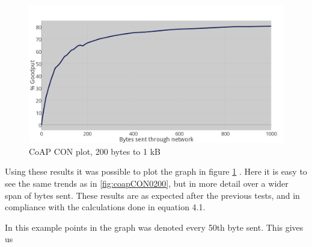 \begin{figure}[ht]
    \centering
    \includegraphics[width=\textwidth]{CON0toK_thickerGRAY.png}    
    \caption{CoAP CON plot, 200 bytes to 1 kB}
    \label{fig:plotCoAPCON200toK}
\end{figure}

Using these results it was possible to plot the graph in figure \ref{fig:plotCoAPCON200toK} . Here it is easy to see the same trends as in  \ref{fig:coapCON0200}, but in more detail over a wider span of bytes sent. These results are as expected after the previous tests, and in compliance with the calculations done in equation 4.1. 

In this example points in the graph was denoted every 50th byte sent. This gives us 



 


